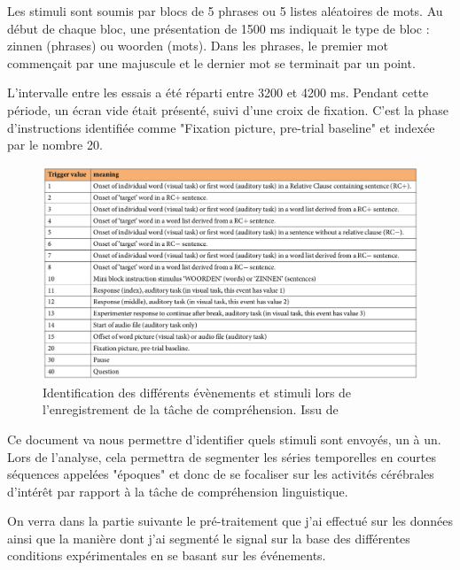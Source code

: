 \vspace{2ex}
Les stimuli sont soumis par blocs de 5 phrases ou 5 listes aléatoires de mots. Au début de chaque bloc, une présentation de 1500 ms indiquait le type de bloc : zinnen (phrases) ou woorden (mots). Dans les phrases, le premier mot commençait par une majuscule et le dernier mot se terminait par un point. 

\vspace{2ex}L'intervalle entre les essais a été réparti entre 3200 et 4200 ms. Pendant cette période, un écran vide était présenté, suivi d'une croix de fixation. C'est la phase d'instructions identifiée comme "Fixation picture, pre-trial baseline" et indexée par le nombre 20.

\begin{figure}[!ht]
    \centering
    \includegraphics[width=20cm]{events_id.png}
    \caption{Identification des différents évènements et stimuli lors de l'enregistrement de la tâche de compréhension. Issu de \cite{4}}
    \label{fig2.3}
\end{figure}

Ce document va nous permettre d'identifier quels stimuli sont envoyés, un à un. Lors de l'analyse, cela permettra de segmenter les séries temporelles en courtes séquences appelées "époques" et donc de se focaliser sur les activités cérébrales d'intérêt par rapport à la tâche de compréhension linguistique.

\vspace{2ex}
On verra dans la partie suivante le pré-traitement que j'ai effectué sur les données ainsi que la manière dont j'ai segmenté le signal sur la base des différentes conditions expérimentales en se basant sur les événements.

